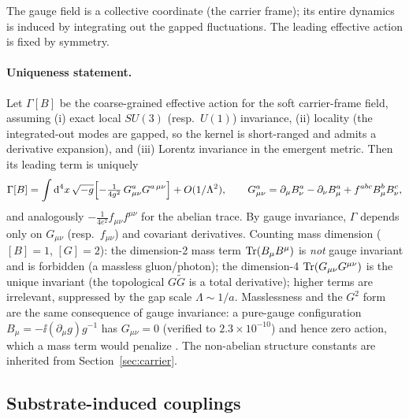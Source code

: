 The gauge field is a collective coordinate (the carrier frame); its entire dynamics is induced
by integrating out the gapped fluctuations. The leading effective action is fixed by symmetry.

\paragraph{Uniqueness statement.} Let $\Gamma[B]$ be the coarse-grained effective action for the
soft carrier-frame field, assuming (i) exact local $SU(3)$ (resp.\ $U(1)$) invariance, (ii)
locality (the integrated-out modes are gapped, so the kernel is short-ranged and admits a
derivative expansion), and (iii) Lorentz invariance in the emergent metric. Then its leading term
is uniquely
\begin{equation}
  \Gamma[B]=\int \mathrm{d}^4x\,\sqrt{-g}\Bigl[-\tfrac{1}{4g^2}\,G^a_{\mu\nu}G^{a\,\mu\nu}\Bigr]+O(1/\Lambda^2),
  \qquad
  G^a_{\mu\nu}=\partial_\mu B^a_\nu-\partial_\nu B^a_\mu+f^{abc}B^b_\mu B^c_\nu,
  \label{eq:ym}
\end{equation}
and analogously $-\tfrac{1}{4e^2}f_{\mu\nu}f^{\mu\nu}$ for the abelian trace. By gauge invariance, $\Gamma$ depends only on $G_{\mu\nu}$ (resp.\ $f_{\mu\nu}$) and
covariant derivatives. Counting mass dimension ($[B]=1$, $[G]=2$): the dimension-2 mass term
$\operatorname{Tr}(B_\mu B^\mu)$ is \emph{not} gauge invariant and is forbidden (a massless gluon/photon);
the dimension-4 $\operatorname{Tr}(G_{\mu\nu}G^{\mu\nu})$ is the unique invariant (the topological
$G\tilde G$ is a total derivative); higher terms are irrelevant, suppressed by the gap scale
$\Lambda\sim 1/a$. Masslessness and the $G^2$ form are the same consequence of gauge invariance:
a pure-gauge configuration $B_\mu=-\ii(\partial_\mu g)g^{-1}$ has $G_{\mu\nu}=0$ (verified to
$2.3\times10^{-10}$) and hence zero action, which a mass term would penalize
\citep{repo}. The non-abelian structure constants are inherited from Section~\ref{sec:carrier}.

\subsection{Substrate-induced couplings}
\label{subsec:couplings}

